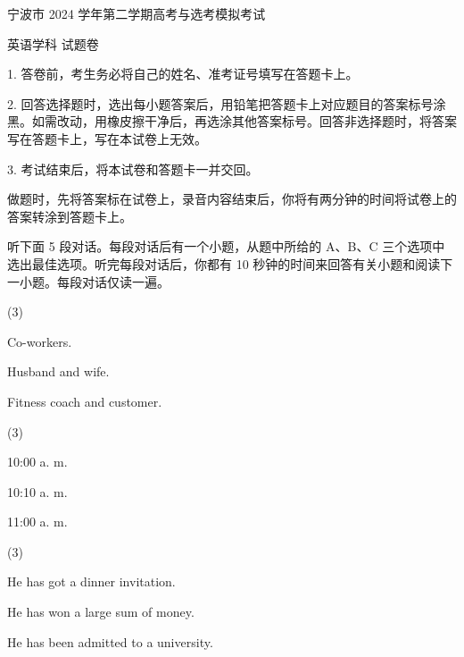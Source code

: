 \documentclass{英语试卷}
\begin{document}
\par 宁波市 2024 学年第二学期高考与选考模拟考试\par
\par 英语学科 试题卷\par
\begin{notice}
\par 1. 答卷前，考生务必将自己的姓名、准考证号填写在答题卡上。\par
\par 2. 回答选择题时，选出每小题答案后，用铅笔把答题卡上对应题目的答案标号涂黑。如需改动，用橡皮擦干净后，再选涂其他答案标号。回答非选择题时，将答案写在答题卡上，写在本试卷上无效。\par
\par 3. 考试结束后，将本试卷和答题卡一并交回。\par
\end{notice}
\par 做题时，先将答案标在试卷上，录音内容结束后，你将有两分钟的时间将试卷上的答案转涂到答题卡上。\par
{}
\par 听下面 5 段对话。每段对话后有一个小题，从题中所给的 A、B、C 三个选项中选出最佳选项。听完每段对话后，你都有 10 秒钟的时间来回答有关小题和阅读下一小题。每段对话仅读一遍。\par
{}
\begin{choices}(3)
  \item Co-workers.
  \item Husband and wife.
  \item Fitness coach and customer.
\end{choices}
\begin{choices}(3)
  \item 10:00 a. m.
  \item 10:10 a. m.
  \item 11:00 a. m.
\end{choices}
\begin{choices}(3)
  \item He has got a dinner invitation.
  \item He has won a large sum of money.
  \item He has been admitted to a university.
\end{choices}
\end{document}
